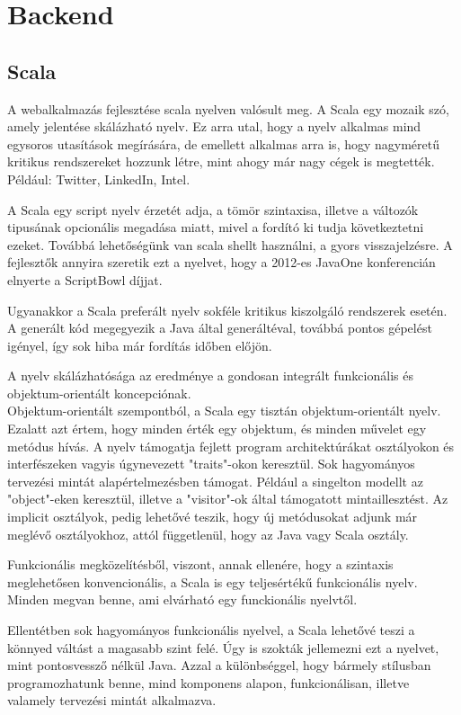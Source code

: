 \section{Backend}
\subsection{Scala}
A webalkalmazás fejlesztése scala nyelven valósult meg. A Scala egy mozaik szó, amely jelentése skálázható nyelv. Ez arra utal, hogy a nyelv alkalmas mind egysoros utasítások megírására, de emellett alkalmas arra is, hogy nagyméretű kritikus rendszereket hozzunk létre, mint ahogy már nagy cégek is megtették. Például: Twitter, LinkedIn, Intel.

A Scala egy script nyelv érzetét adja, a tömör szintaxisa, illetve a változók tipusának opcionális megadása miatt, mivel a fordító ki tudja következtetni ezeket. Továbbá lehetőségünk van scala shellt használni, a gyors visszajelzésre. A fejlesztők annyira szeretik ezt a nyelvet, hogy a 2012-es JavaOne konferencián elnyerte a ScriptBowl díjjat.

Ugyanakkor a Scala preferált nyelv sokféle kritikus kiszolgáló rendszerek esetén. A generált kód megegyezik a Java által generáltéval, továbbá pontos gépelést igényel, így sok hiba már fordítás időben előjön.

A nyelv skálázhatósága az eredménye a gondosan integrált funkcionális és objektum-orientált koncepciónak.\\
Objektum-orientált szempontból, a Scala egy tisztán objektum-orientált nyelv. Ezalatt azt értem, hogy minden érték egy objektum, és minden művelet egy metódus hívás. A nyelv támogatja fejlett program architektúrákat osztályokon és interfészeken vagyis úgynevezett "traits"-okon keresztül. Sok hagyományos tervezési mintát alapértelmezésben támogat. Például a singelton modellt az "object"-eken keresztül, illetve a "visitor"-ok által támogatott mintaillesztést. Az implicit osztályok, pedig lehetővé teszik, hogy új metódusokat adjunk már meglévő osztályokhoz, attól függetlenül, hogy az Java vagy Scala osztály.

Funkcionális megközelítésből, viszont, annak ellenére, hogy a szintaxis meglehetősen konvencionális, a Scala is egy teljesértékű funkcionális nyelv. Minden megvan benne, ami elvárható egy funckionális nyelvtől.

Ellentétben sok hagyományos funkcionális nyelvel, a Scala lehetővé teszi a könnyed váltást a magasabb szint felé. Úgy is szokták jellemezni ezt a nyelvet, mint pontosvessző nélkül Java. Azzal a különbséggel, hogy bármely stílusban programozhatunk benne, mind komponens alapon, funkcionálisan, illetve valamely tervezési mintát alkalmazva.

